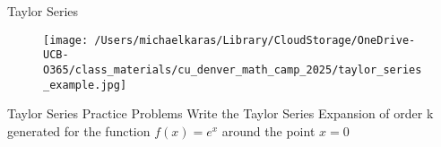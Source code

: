 \documentclass[aspectratio=169]{beamer}
\begin{document}
\begin{frame}{Taylor Series}\label{main1}
    \begin{figure}
        \centering
        \texttt{[image: /Users/michaelkaras/Library/CloudStorage/OneDrive-UCB-O365/class\_materials/cu\_denver\_math\_camp\_2025/taylor\_series\_example.jpg]}
    \end{figure}
\end{frame}

\begin{frame}{Taylor Series Practice Problems}\label{main1}
	\vspace{-4cm}
Write the Taylor Series Expansion of order k generated for the function \( f(x) = e^{x} \) around the point \( x = 0 \)
\end{frame}
\end{document}
